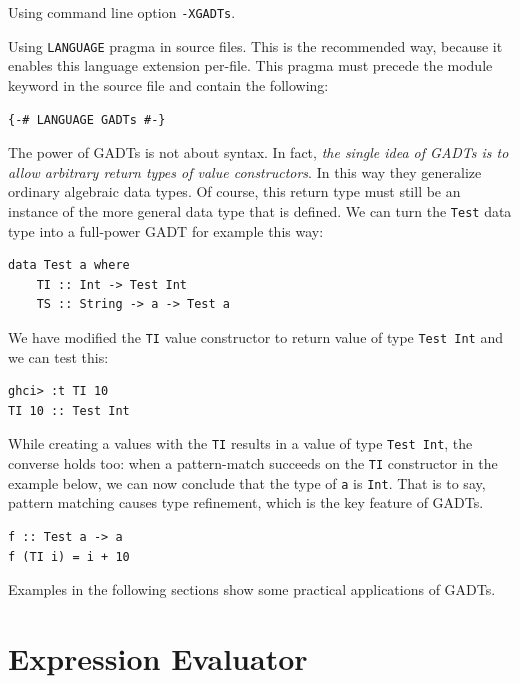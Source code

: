 \documentclass{tmr}
\newcommand{\italic}[1]{\textit{#1}}
\begin{document}
\begin{longenum}

\item Using command line option \verb|-XGADTs|.

\item Using \verb|LANGUAGE| pragma in source files. This is the recommended way, because it enables this language extension per-file. This pragma must precede the module keyword in the source file and contain the following:
\begin{Verbatim}
{-# LANGUAGE GADTs #-}
\end{Verbatim}

\end{longenum}

The power of GADTs is not about syntax. In fact, \italic{the single idea of GADTs is to allow arbitrary return types of value constructors}. In this way they generalize ordinary algebraic data types. Of course, this return type must still be an instance of the more general data type that is defined. We can turn the \verb|Test| data type into a full-power GADT for example this way:

\begin{Verbatim}
data Test a where
    TI :: Int -> Test Int
    TS :: String -> a -> Test a
\end{Verbatim}

We have modified the \verb|TI| value constructor to return value of type \verb|Test Int| and we can test this:

\begin{Verbatim}
ghci> :t TI 10
TI 10 :: Test Int
\end{Verbatim}

While creating a values with the \verb|TI| results in a value of type \verb|Test Int|, the converse holds too: when a pattern-match succeeds on the \verb|TI| constructor in the example below, we can now conclude that the type of \verb|a| is \verb|Int|. That is to say, pattern matching causes type refinement, which is the key feature of GADTs.

\begin{Verbatim}
f :: Test a -> a
f (TI i) = i + 10
\end{Verbatim}

Examples in the following sections show some practical applications of GADTs.

\section{Expression Evaluator}
\label{sec:expression_evaluator}
\end{document}
